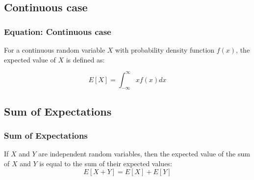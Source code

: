\subsection{Continuous case}\label{subsec:continuous}
\begin{frame}
    \frametitle{Equation: Continuous case}
    For a continuous random variable $X$ with probability density function $f(x)$, the expected value of $X$ is defined as:
    \begin{block}{}
        \begin{equation}
            E[X] = \int_{-\infty}^{\infty} x f(x) dx\label{eq:equation3}
        \end{equation}
    \end{block}
\end{frame}

\subsection{Sum of Expectations}\label{subsec:sum}
\begin{frame}
    \frametitle{Sum of Expectations}
    \begin{block}{}
        If $X$ and $Y$ are independent random variables, then the expected value of the sum of $X$ and $Y$ is equal to the sum of their expected values:
        \begin{equation}
            E[X+Y] = E[X] + E[Y]\label{eq:equation4}
        \end{equation}
    \end{block}
\end{frame}
